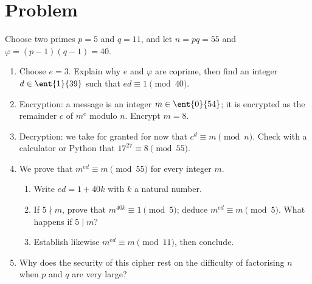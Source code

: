 \mxnewpage
\section{Problem}
\begin{problem}
Choose two primes $p=5$ and $q=11$, and let $n=pq=55$ and $\varphi=(p-1)(q-1)=40$.
\begin{enumerate}
\item Choose $e=3$. Explain why $e$ and $\varphi$ are coprime, then find an integer $d\in\ent{1}{39}$ such that $ed\equiv1\pmod{40}$.
\item Encryption: a message is an integer $m\in\ent{0}{54}$; it is encrypted as the remainder $c$ of $m^e$ modulo $n$. Encrypt $m=8$.
\item Decryption: we take for granted for now that $c^d\equiv m\pmod n$. Check with a calculator or Python that $17^{27}\equiv8\pmod{55}$.
\item We prove that $m^{ed}\equiv m\pmod{55}$ for every integer $m$.
\begin{enumerate}
\item Write $ed=1+40k$ with $k$ a natural number.
\item If $5\nmid m$, prove that $m^{40k}\equiv1\pmod5$; deduce $m^{ed}\equiv m\pmod5$. What happens if $5\mid m$?
\item Establish likewise $m^{ed}\equiv m\pmod{11}$, then conclude.
\end{enumerate}
\item Why does the security of this cipher rest on the difficulty of factorising $n$ when $p$ and $q$ are very large?
\end{enumerate}
\end{problem}
